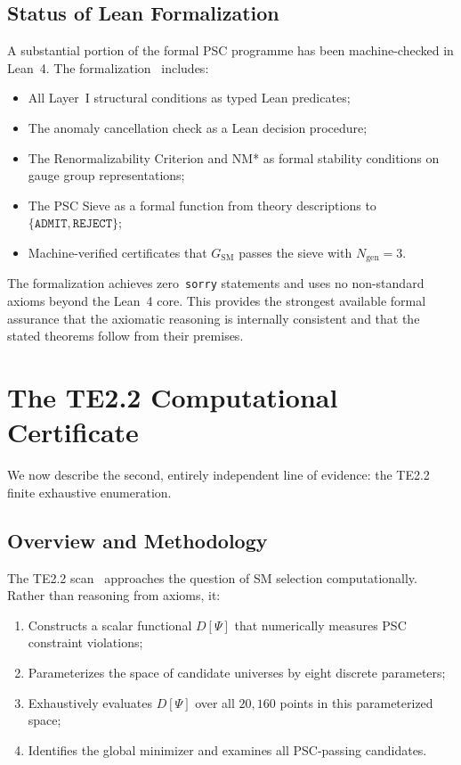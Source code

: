 \documentclass[11pt,twocolumn]{article}
\theoremstyle{remark}
\begin{document}
\subsection{Status of Lean Formalization}
\label{sec:lean}

A substantial portion of the formal PSC programme has been
machine-checked in Lean~4.
The formalization~\cite{SpivackUGPFormalization} includes:
\begin{itemize}
  \item All Layer~I structural conditions as typed Lean predicates;
  \item The anomaly cancellation check as a Lean decision procedure;
  \item The Renormalizability Criterion and NM* as formal stability
        conditions on gauge group representations;
  \item The PSC Sieve as a formal function from theory descriptions
        to $\{\mathtt{ADMIT},\mathtt{REJECT}\}$;
  \item Machine-verified certificates that $G_{\mathrm{SM}}$ passes
        the sieve with $N_{\mathrm{gen}}=3$.
\end{itemize}
The formalization achieves zero~\texttt{sorry} statements and uses
no non-standard axioms beyond the Lean~4 core.
This provides the strongest available formal assurance that the
axiomatic reasoning is internally consistent and
that the stated theorems follow from their premises.

\section{The TE2.2 Computational Certificate}
\label{sec:te22}

We now describe the second, entirely independent line of evidence:
the TE2.2 finite exhaustive enumeration.

\subsection{Overview and Methodology}

The TE2.2 scan~\cite{SpivackPSCConcordance} approaches the question of SM
selection computationally.
Rather than reasoning from axioms, it:
\begin{enumerate}[(1)]
  \item Constructs a scalar functional $D[\Psi]$ that numerically
        measures PSC constraint violations;
  \item Parameterizes the space of candidate universes by eight
        discrete parameters;
  \item Exhaustively evaluates $D[\Psi]$ over all $20{,}160$ points in
        this parameterized space;
  \item Identifies the global minimizer and examines all PSC-passing
        candidates.
\end{enumerate}
\end{document}
